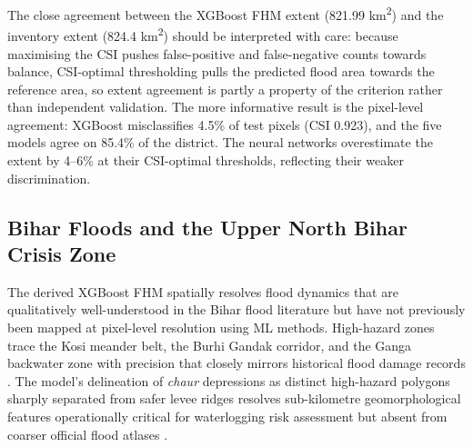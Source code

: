 \documentclass[12pt, a4paper]{article}
\begin{document}
The close agreement between the XGBoost FHM extent (821.99 km\textsuperscript{2}) and the inventory extent (824.4 km\textsuperscript{2}) should be interpreted with care: because maximising the CSI pushes false-positive and false-negative counts towards balance, CSI-optimal thresholding pulls the predicted flood area towards the reference area, so extent agreement is partly a property of the criterion rather than independent validation. The more informative result is the pixel-level agreement: XGBoost misclassifies 4.5\% of test pixels (CSI 0.923), and the five models agree on 85.4\% of the district. The neural networks overestimate the extent by 4--6\% at their CSI-optimal thresholds, reflecting their weaker discrimination.

\subsection{Bihar Floods and the Upper North Bihar Crisis Zone}

The derived XGBoost FHM spatially resolves flood dynamics that are qualitatively well-understood in the Bihar flood literature but have not previously been mapped at pixel-level resolution using ML methods. High-hazard zones trace the Kosi meander belt, the Burhi Gandak corridor, and the Ganga backwater zone with precision that closely mirrors historical flood damage records \citep{bhuvan2010, tatatrusts2024, sinha2008, Arora2025SciRep, Arora2022SERRA}. The model's delineation of \textit{chaur} depressions as distinct high-hazard polygons sharply separated from safer levee ridges resolves sub-kilometre geomorphological features operationally critical for waterlogging risk assessment but absent from coarser official flood atlases \citep{bhuvan2010}.
\end{document}
